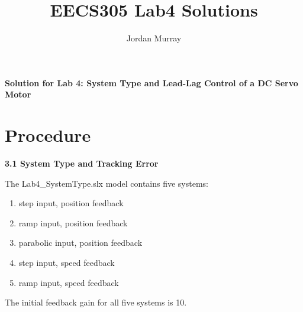 \documentclass[11pt,a4paper]{article}
\author{Jordan Murray}
\title{EECS305 Lab4 Solutions}
\begin{document}
\begin{center}
\fontsize{24}{12}\selectfont
\textbf{Solution for Lab 4: System Type and Lead-Lag Control of a DC Servo Motor }
\end{center}

\section{Procedure}
\textbf{3.1 System Type and Tracking Error}

The Lab4\_SystemType.slx model contains five systems:
\begin{enumerate}
	\item step input, position feedback
	\item ramp input, position feedback
	\item parabolic input, position feedback
	\item step input, speed feedback
	\item ramp input, speed feedback
\end{enumerate}

The initial feedback gain for all five systems is 10.
\end{document}

